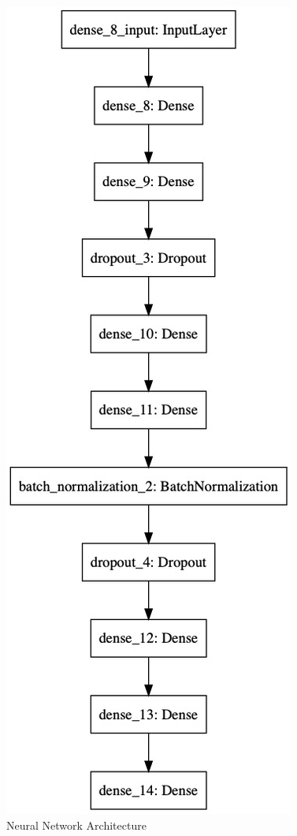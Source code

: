 \documentclass[runningheads]{llncs}
\begin{document}
\begin{figure}[H]
\centering
\includegraphics[scale = 0.4,keepaspectratio]{figs/nn.jpg}
\caption{Neural Network Architecture}
\label{fig:nn_arch}
\end{figure}
\end{document}
